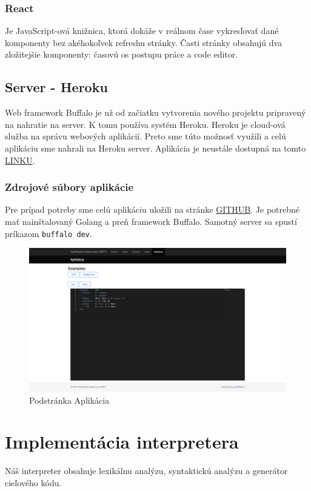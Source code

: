 \subsubsection{React}
Je JavaScript-ová knižnica, ktorá dokáže v reálnom čase vykresľovať dané komponenty bez akéhokoľvek refreshu
stránky. Časti stránky obsahujú dva zložitejšie komponenty: časovú os postupu práce a code editor.

\subsection{Server - Heroku}
Web framework Buffalo je už od začiatku vytvorenia nového projektu pripravený na nahratie na server. K tomu
používa systém Heroku. Heroku je cloud-ová služba na správu webových aplikácií. Preto sme túto možnosť využili
a celú aplikáciu sme nahrali na Heroku server. Aplikácia je neustále dostupná na tomto 
\href{https://spaldon-diplomovka.herokuapp.com}{LINKU}.

\subsubsection{Zdrojové súbory aplikácie}
Pre prípad potreby sme celú aplikáciu uložili na stránke \href{https://github.com/FiFOOO/unity_verificator}{GITHUB}. 
Je potrebné mať nainštalovaný Golang a preň framework Buffalo. Samotný server sa spustí príkazom 
\texttt{buffalo dev}.


\begin{figure}[H]
    \centerline{\includegraphics[width=1\textwidth]{images/web}}
    \caption[Podstránka Aplikácia]{Podstránka Aplikácia}
    \label{img:web}
\end{figure}

\section{Implementácia interpretera}
Náš interpreter obsahuje lexikálnu analýzu, syntaktickú analýzu a generátor cieľového kódu. 



